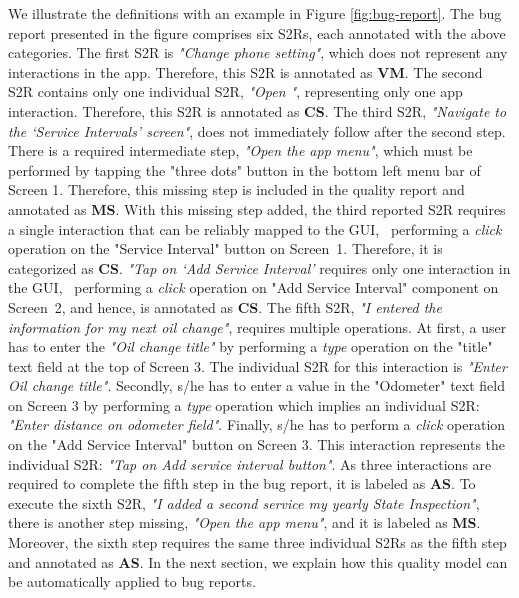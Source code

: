 We illustrate the definitions with an example in Figure \ref{fig:bug-report}. 
The bug report presented in the figure comprises six S2Rs, each annotated with the above categories. \noindent{} The first S2R is \textit{"Change  phone setting"}, which does not represent any interactions in the app. 
Therefore, this S2R is annotated as \textbf{VM}.
\noindent{} The second S2R contains only one individual S2R, \textit{"Open "}, representing only one app interaction. Therefore, this S2R is annotated as \textbf{CS}. \noindent{} The third S2R, \textit{"Navigate to the `Service Intervals' screen"}, does not immediately follow after the second step. There is a required intermediate step, \textit{"Open the app menu"}, which must be performed by tapping the "three dots" button in the bottom left menu bar of Screen 1.
Therefore, this missing step is included in the quality report and annotated as \textbf{MS}. 
With this missing step added, the third reported S2R requires a single interaction that can be reliably mapped to the GUI, \ie\ performing a \textit{click} operation on the "Service Interval" button on Screen~1. Therefore, it is categorized as \textbf{CS}. 
\noindent{} \textit{"Tap on `Add Service Interval'} requires only one interaction in the GUI, \ie\ performing a \textit{click} operation on "Add Service Interval" component on Screen~2, and hence, is annotated as \textbf{CS}. 
\noindent{} The fifth S2R, \textit{"I entered the information for my next
oil change"}, requires multiple operations. At first, a user has to enter the \textit{"Oil change title"} by performing a \textit{type} operation on the "title" text field at the top of Screen 3. The individual S2R for this interaction is \textit{"Enter Oil change title"}. Secondly, s/he has to enter a value in the "Odometer" text field on Screen 3 by performing a \textit{type} operation which implies an individual S2R: \textit{"Enter distance on odometer field"}. Finally, s/he has to perform a \textit{click} operation on the "Add Service Interval" button on Screen 3. This interaction represents the individual S2R: \textit{"Tap on Add service interval button"}. As three interactions are required to complete the fifth step in the bug report, it is labeled as \textbf{AS}.
\noindent{} To execute the sixth S2R, \textit{"I added a second service my yearly State Inspection"}, there is another step missing, \textit{"Open the app menu"}, and it is labeled as \textbf{MS}. 
Moreover, the sixth step requires the same three individual S2Rs as the fifth step and annotated as \textbf{AS}. In the next section, we explain how this quality model can be automatically applied to bug reports.


